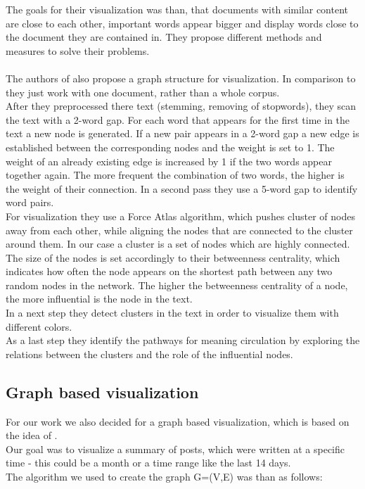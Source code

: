 The goals for their visualization was than, that documents with similar content are close to each other, important words appear bigger and display words close to the document they are contained in. 
They propose different methods and measures to solve their problems. \\
~\\
The authors of \cite{visualiuationCorpus3}  also propose a graph structure for visualization. In comparison to \cite{doi:10.1117/12.647867} they just work with one document, rather than a whole corpus. \\
After they preprocessed there text (stemming, removing of stopwords), they scan the text with a 2-word gap. For each word that appears for the first time in the text a new node is generated. If a new pair appears in a 2-word gap a new edge is established between the corresponding nodes and the weight is set to 1. The weight of an already existing edge is increased by 1 if the two words appear together again. The more frequent the combination of two words, the higher is the weight of their connection. In a second pass they use a 5-word gap to identify word pairs. \\
For visualization they use a Force Atlas algorithm, which pushes cluster of nodes away from each other, while aligning the nodes that are connected to the cluster around them. In our case a cluster is a set of nodes which are highly connected. \\
The size of the nodes is set accordingly to their betweenness centrality, which indicates how often the node appears on the shortest path between any two random nodes in the network. The higher the betweenness centrality of a node, the more influential is the node in the text. \\
In a next step they detect clusters in the text in order to visualize them with different colors. \\
As a last step they identify the pathways for meaning circulation by exploring the relations between the clusters and the role of the influential nodes.

\subsection{Graph based visualization} \label{sec:graphVisualization}

For our work we also decided for a graph based visualization, which is based on the idea of \cite{visualiuationCorpus3}. \\
Our goal was to visualize a summary of posts, which were written at a specific time - this could be a month or a time range like the last 14 days. \\
The algorithm we used to  create the graph G=(V,E) was than as follows: \\

